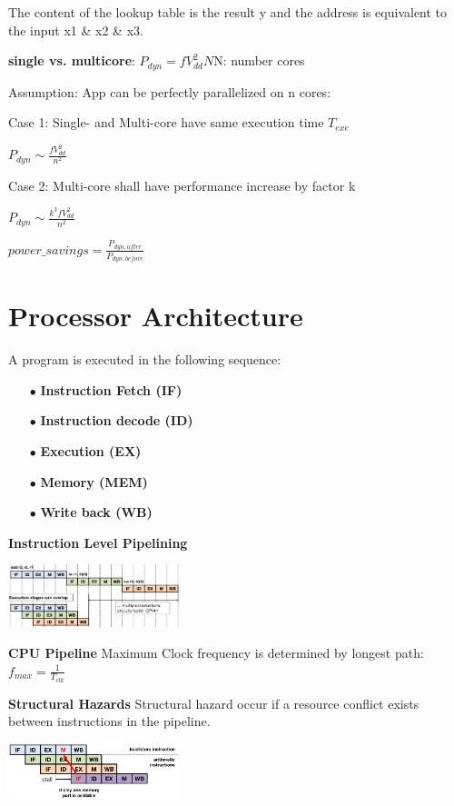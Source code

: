 \documentclass[english]{latex4ei/latex4ei_sheet}
\begin{document}
The content of the lookup table is the result y and the address is equivalent to the input x1 \& x2 \& x3.

\textbf{single vs. multicore}:
$P_{dyn} = f V_{dd}^2 N $\quad N: number cores

Assumption: App can be perfectly parallelized on n cores:

Case 1: Single- and Multi-core have same execution time $T_{exe}$

$P_{dyn} \sim \frac{f V_{dd}^2}{n^2}$

Case 2: Multi-core shall have performance increase by factor k

$P_{dyn} \sim \frac{k^3 f V_{dd}^2}{n^2}$

$power\_savings = \frac{P_{dyn, after}}{P_{dyn, before}}$

\section{Processor Architecture}

A program is executed in the following sequence:
\begin{enumerate}
	\item[$\bullet$] \textbf{Instruction Fetch (IF)}
	\item[$\bullet$] \textbf{Instruction decode (ID)}
	\item[$\bullet$] \textbf{Execution (EX)}
	\item[$\bullet$] \textbf{Memory (MEM)}
	\item[$\bullet$] \textbf{Write back (WB)}
\end{enumerate}

\textbf{Instruction Level Pipelining}
\begin{center}
	\includegraphics[width = 5cm]{images/4.ProcessorArchitecture/ILP.png}
\end{center}

\textbf{CPU Pipeline} Maximum Clock frequency is determined by longest path: $f_{max} = \frac{1}{T_{clk}}$

\textbf{Structural Hazards} Structural hazard occur if a resource conflict exists between instructions in the pipeline.
\begin{center}
	\includegraphics[width = 5cm]{images/4.ProcessorArchitecture/StrHazard.png}
\end{center}
\end{document}
